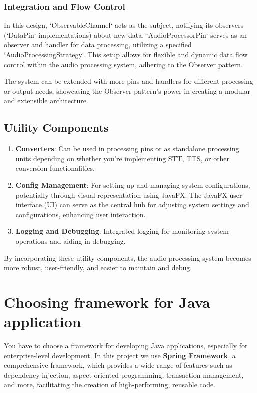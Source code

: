 \documentclass[a4paper,12pt]{article}
\begin{document}
\subsubsection*{Integration and Flow Control}
In this design, `ObservableChannel` acts as the subject, notifying its observers
(`DataPin` implementations) about new data.
`AudioProcessorPin` serves as an observer and handler for data processing,
utilizing a specified `AudioProcessingStrategy`.
This setup allows for flexible and dynamic data flow control within the audio processing system,
adhering to the Observer pattern.

The system can be extended with more pins and handlers for different processing or output needs,
showcasing the Observer pattern's power in creating a modular and extensible architecture.

\subsection{Utility Components}
\begin{enumerate}
  \item \textbf{Converters}: Can be used in processing pins or as standalone processing units
  depending on whether you're implementing STT, TTS, or other conversion functionalities.
  \item \textbf{Config Management}: For setting up and managing system configurations,
  potentially through visual representation using JavaFX. The JavaFX user interface (UI)
  can serve as the central hub for adjusting system settings and configurations, enhancing user interaction.
  \item \textbf{Logging and Debugging}: Integrated logging for monitoring system operations
  and aiding in debugging.
\end{enumerate}

By incorporating these utility components, the audio processing system becomes more robust,
user-friendly, and easier to maintain and debug.

\section{Choosing framework for Java application}
You have to choose a framework for developing Java applications,
especially for enterprise-level development.
In this project we use \textbf{Spring Framework},
a comprehensive framework, which provides a wide range of features such as dependency injection,
aspect-oriented programming, transaction management, and more,
facilitating the creation of high-performing, reusable code.
\end{document}
